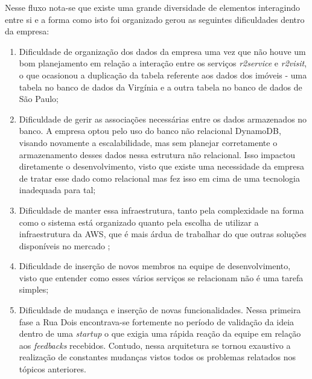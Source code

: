 Nesse fluxo nota-se que existe uma grande diversidade de elementos interagindo entre
si e a forma como isto foi organizado gerou as seguintes dificuldades dentro da empresa:

    \begin{enumerate}
        \item{Dificuldade de organização dos dados da empresa uma vez que não houve
        um bom planejamento em relação a interação entre os serviços \textit{r2service}
        e \textit{r2visit}, o que ocasionou a duplicação da tabela referente aos dados
        dos imóveis - uma tabela no banco de dados da Virgínia e a outra tabela no banco
        de dados de São Paulo;}
        \item{Dificuldade de gerir as associações necessárias entre os dados armazenados
        no banco. A empresa optou pelo uso do banco não relacional DynamoDB, visando
        novamente a escalabilidade, mas sem planejar corretamente o armazenamento desses
        dados nessa estrutura não relacional. Isso impactou diretamente o desenvolvimento,
        visto que existe uma necessidade da empresa de tratar esse dado como relacional
        mas fez isso em cima de uma tecnologia inadequada para tal;}
        \item{Dificuldade de manter essa infraestrutura, tanto pela complexidade na forma
        como o sistema está organizado quanto pela escolha de utilizar a infraestrutura da
        \gls{AWS}, que é mais árdua de trabalhar do que outras soluções disponíveis no mercado
        \cite{kavya};}
        \item{Dificuldade de inserção de novos membros na equipe de desenvolvimento, visto
        que entender como esses vários serviços se relacionam não é uma tarefa simples;}
        \item{Dificuldade de mudança e inserção de novas funcionalidades. Nessa primeira
        fase a Rua Dois encontrava-se fortemente no período de validação da ideia dentro
        de uma \textit{startup} o que exigia uma rápida reação da equipe em relação aos
        \textit{feedbacks} recebidos. Contudo, nessa arquitetura se tornou exaustivo a
        realização de constantes mudanças vistos todos os problemas relatados nos tópicos
        anteriores.}
    \end{enumerate}

